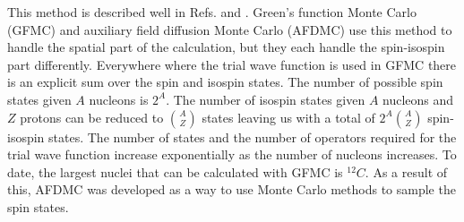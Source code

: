 This method is described well in Refs. \cite{carlson2015} and \cite{foulkes2001}. Green's function Monte Carlo (GFMC) and auxiliary field diffusion Monte Carlo (AFDMC) use this method to handle the spatial part of the calculation, but they each handle the spin-isospin part differently. Everywhere where the trial wave function is used in GFMC there is an explicit sum over the spin and isospin states. The number of possible spin states given $A$ nucleons is $2^A$. The number of isospin states given $A$ nucleons and $Z$ protons can be reduced to ${A \choose Z}$ states leaving us with a total of $2^A {A \choose Z}$ spin-isospin states. The number of states and the number of operators required for the trial wave function increase exponentially as the number of nucleons increases. To date, the largest nuclei that can be calculated with GFMC is ${}^{12}C$. As a result of this, AFDMC was developed as a way to use Monte Carlo methods to sample the spin states.

